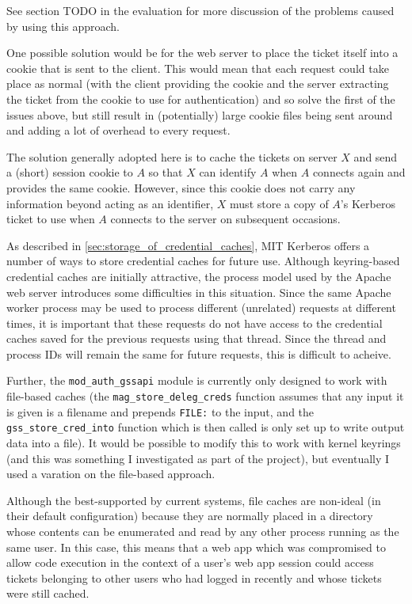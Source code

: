 \documentclass{report}
\begin{document}
See section TODO in the evaluation for more discussion of the problems caused by using this approach.

One possible solution would be for the web server to place the ticket itself into a cookie that is sent to the client. This would mean that each request could take place as normal (with the client providing the cookie and the server extracting the ticket from the cookie to use for authentication) and so solve the first of the issues above, but still result in (potentially) large cookie files being sent around and adding a lot of overhead to every request.

The solution generally adopted here is to cache the tickets on server $X$ and send a (short) session cookie to $A$ so that $X$ can identify $A$ when $A$ connects again and provides the same cookie. However, since this cookie does not carry any information beyond acting as an identifier, $X$ must store a copy of $A$'s Kerberos ticket to use when $A$ connects to the server on subsequent occasions.

As described in \autoref{sec:storage_of_credential_caches}, MIT Kerberos offers a number of ways to store credential caches for future use. Although keyring-based credential caches are initially attractive, the process model used by the Apache web server introduces some difficulties in this situation. Since the same Apache worker process may be used to process different (unrelated) requests at different times, it is important that these requests do not have access to the credential caches saved for the previous requests using that thread. Since the thread and process IDs will remain the same for future requests, this is difficult to acheive.

Further, the \verb+mod_auth_gssapi+ module is currently only designed to work with file-based caches (the \verb+mag_store_deleg_creds+ function assumes that any input it is given is a filename and prepends \texttt{FILE:} to the input, and the \verb+gss_store_cred_into+ function which is then called is only set up to write output data into a file). It would be possible to modify this to work with kernel keyrings (and this was something I investigated as part of the project), but eventually I used a varation on the file-based approach.

Although the best-supported by current systems, file caches are non-ideal (in their default configuration) because they are normally placed in a directory whose contents can be enumerated and read by any other process running as the same user. In this case, this means that a web app which was compromised to allow code execution in the context of a user's web app session could access tickets belonging to other users who had logged in recently and whose tickets were still cached.
\end{document}
